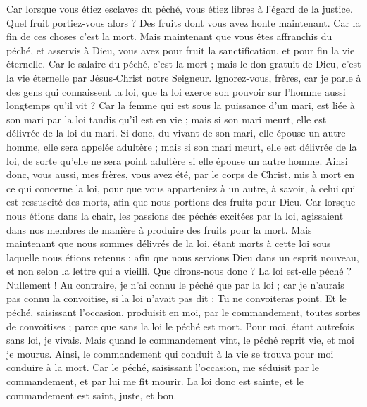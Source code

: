 \begin{multicols}{2}
Car lorsque vous étiez esclaves du péché, vous étiez libres à l'égard de la justice.
Quel fruit portiez-vous alors ? Des fruits dont vous avez honte maintenant. Car la fin de ces choses c’est la mort.
Mais maintenant que vous êtes affranchis du péché, et asservis à Dieu, vous avez pour fruit la sanctification, et pour fin la vie éternelle.
Car le salaire du péché, c'est la mort ; mais le don gratuit de Dieu, c'est la vie éternelle par Jésus-Christ notre Seigneur.
\VerseOne{}Ignorez-vous, frères, car je parle à des gens qui connaissent la loi, que la loi exerce son pouvoir sur l’homme aussi longtemps qu’il vit ?
Car la femme qui est sous la puissance d'un mari, est liée à son mari par la loi tandis qu'il est en vie ; mais si son mari meurt, elle est délivrée de la loi du mari.
Si donc, du vivant de son mari, elle épouse un autre homme, elle sera appelée adultère ; mais si son mari meurt, elle est délivrée de la loi, de sorte qu'elle ne sera point adultère si elle épouse un autre homme.
Ainsi donc, vous aussi, mes frères, vous avez été, par le corps de Christ, mis à mort en ce qui concerne la loi, pour que vous apparteniez à un autre, à savoir, à celui qui est ressuscité des morts, afin que nous portions des fruits pour Dieu.
Car lorsque nous étions dans la chair, les passions des péchés excitées par la loi, agissaient dans nos membres de manière à produire des fruits pour la mort.
Mais maintenant que nous sommes délivrés de la loi, étant morts à cette loi sous laquelle nous étions retenus ; afin que nous servions Dieu dans un esprit nouveau, et non selon la lettre qui a vieilli.
Que dirons-nous donc ? La loi est-elle péché ? Nullement ! Au contraire, je n'ai connu le péché que par la loi ; car je n’aurais pas connu la convoitise, si la loi n’avait pas dit : Tu ne convoiteras point.
Et le péché, saisissant l’occasion, produisit en moi, par le commandement, toutes sortes de convoitises ; parce que sans la loi le péché est mort.
Pour moi, étant autrefois sans loi, je vivais. Mais quand le commandement vint, le péché reprit vie, et moi je mourus.
Ainsi, le commandement qui conduit à la vie se trouva pour moi conduire à la mort.
Car le péché, saisissant l’occasion, me séduisit par le commandement, et par lui me fit mourir.
La loi donc est sainte, et le commandement est saint, juste, et bon.

\end{multicols}
